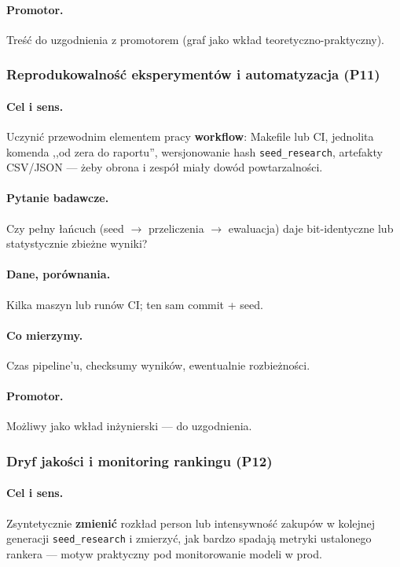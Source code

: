 \documentclass[a4paper,11pt]{article}
\begin{document}
\paragraph{Promotor.}
Treść do uzgodnienia z promotorem (graf jako wkład teoretyczno-praktyczny).

\subsubsection{Reprodukowalność eksperymentów i automatyzacja (\textbf{P11})}

\paragraph{Cel i sens.}
Uczynić przewodnim elementem pracy \textbf{workflow}: Makefile lub CI, jednolita komenda ,,od zera do raportu'', wersjonowanie hash \texttt{seed\_research}, artefakty CSV/JSON --- żeby obrona i zespół miały dowód powtarzalności.

\paragraph{Pytanie badawcze.}
Czy pełny łańcuch (seed $\to$ przeliczenia $\to$ ewaluacja) daje bit-identyczne lub statystycznie zbieżne wyniki?

\paragraph{Dane, porównania.}
Kilka maszyn lub runów CI; ten sam commit + seed.

\paragraph{Co mierzymy.}
Czas pipeline'u, checksumy wyników, ewentualnie rozbieżności.

\paragraph{Promotor.}
Możliwy jako wkład inżynierski --- do uzgodnienia.

\subsubsection{Dryf jakości i monitoring rankingu (\textbf{P12})}

\paragraph{Cel i sens.}
Zsyntetycznie \textbf{zmienić} rozkład person lub intensywność zakupów w kolejnej generacji \texttt{seed\_research} i zmierzyć, jak bardzo spadają metryki ustalonego rankera --- motyw praktyczny pod monitorowanie modeli w prod.
\end{document}
